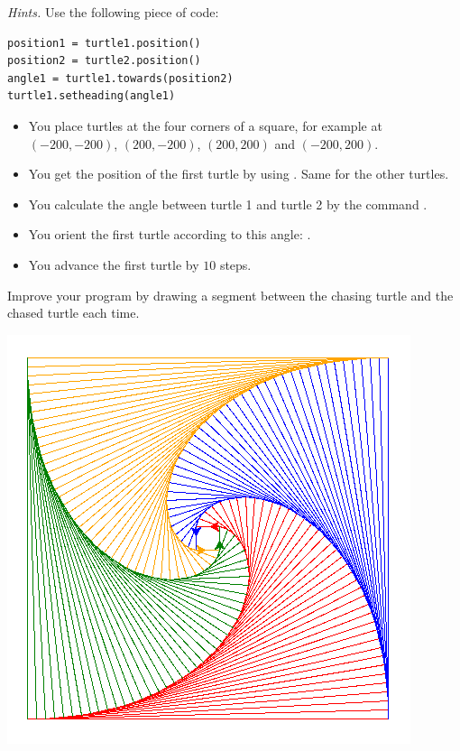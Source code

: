 \documentclass[11pt,class=report,crop=false]{standalone}
\begin{document}
\begin{activite}
\emph{Hints.}
Use the following piece of code:
\begin{center}
\begin{minipage}{0.5\textwidth}
\begin{lstlisting}
position1 = turtle1.position()
position2 = turtle2.position()
angle1 = turtle1.towards(position2)
turtle1.setheading(angle1)
\end{lstlisting}
\end{minipage}
\end{center}
\begin{itemize}
  \item You place turtles at the four corners of a square, for example at $(-200,-200)$, $(200,-200)$, $(200,200)$ and $(-200,200)$.
  \item You get the position of the first turtle by using 
  .
  Same for the other turtles.
  \item You calculate the angle between turtle 1 and turtle 2 by the command
  .
  \item You orient the first turtle according to this angle:
  .
  \item You advance the first turtle by $10$ steps.
\end{itemize}

Improve your program by drawing a segment between the chasing turtle and the chased turtle each time.

\begin{center}
\includegraphics[scale=\myscale,scale=0.5]{screen-turtle-6b}
\end{center}  
\end{activite}
\end{document}
